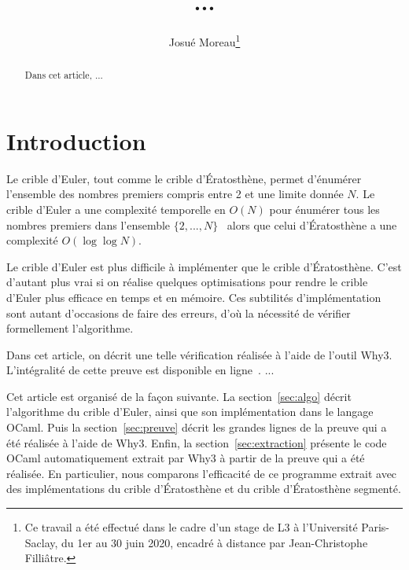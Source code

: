 \documentclass[a4paper]{easychair}
\begin{document}
\title{...}
\author{Josué Moreau\thanks{Ce travail a été effectué dans le cadre
    d'un stage de L3 à l'Université Paris-Saclay, du 1er au 30 juin
    2020, encadré à distance par Jean-Christophe Filliâtre.}}
\maketitle

\begin{abstract}
  Dans cet article, ...
\end{abstract}

\section{Introduction}


Le crible d'Euler, tout comme le crible d'Ératosthène, permet d'énumérer
l'ensemble des nombres premiers compris entre 2 et une limite donnée $N$.
Le crible d'Euler a une complexité temporelle en $O(N)$ pour énumérer tous les
nombres premiers dans l'ensemble $\{2,...,N\}$~\cite{crible-euler} alors que celui
d'Ératosthène a une complexité $O(\log\log N)$.

Le crible d'Euler est plus difficile à implémenter que le crible d'Ératosthène.
C'est d'autant plus vrai si on réalise quelques optimisations pour
rendre le crible d'Euler plus efficace en temps et en mémoire.
Ces subtilités d'implémentation sont autant d'occasions de faire des erreurs,
d'où la nécessité de vérifier formellement l'algorithme.

Dans cet article, on décrit une telle vérification réalisée à l'aide de l'outil Why3.
L'intégralité de cette preuve est disponible en ligne~\cite{mapreuve}.
...

Cet article est organisé de la façon suivante.
La section~\ref{sec:algo} décrit l'algorithme du crible d'Euler, ainsi que son
implémentation dans le langage OCaml.
Puis la section~\ref{sec:preuve} décrit les grandes lignes de la preuve qui a été
réalisée à l'aide de Why3.
Enfin, la section~\ref{sec:extraction} présente le code OCaml
automatiquement extrait par Why3 à partir
de la preuve qui a été réalisée. En particulier, nous comparons l'efficacité de
ce programme extrait avec des implémentations du crible d'Ératosthène et du
crible d'Ératosthène segmenté.
\end{document}
